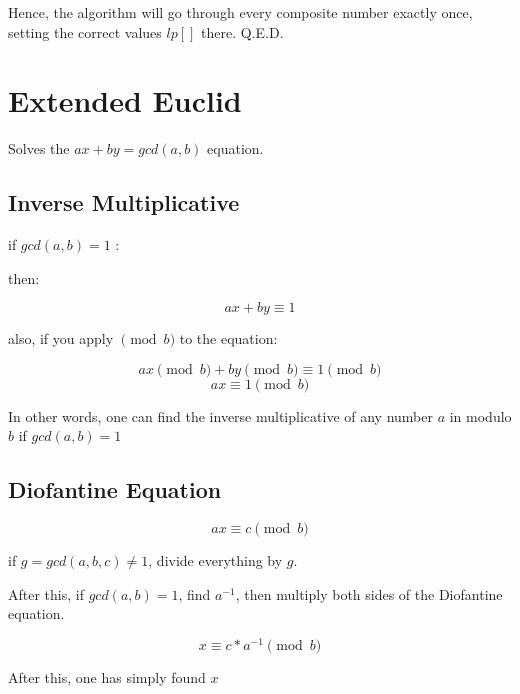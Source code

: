         Hence, the algorithm will go through every composite number exactly once, setting the correct values 
        $lp []$ there. Q.E.D.



\section{Extended Euclid}

    Solves the $ ax + by = gcd(a, b)$ equation.

    \subsection{Inverse Multiplicative}

    if \textbf{ $gcd(a, b) = 1$ }:

    then:

    $$ax + by \equiv 1$$

    also, if you apply $\pmod{b}$ to the equation:

    $$ ax \pmod{b} + by \pmod{b} \equiv 1 \pmod{b} $$
    $$ ax \equiv 1 \pmod{b} $$

    In other words, one can find the inverse multiplicative of any number $a$ in modulo $b$ if $gcd(a, b) = 1$

    \subsection{Diofantine Equation}

    $$ ax \equiv c \pmod{b} $$

    if $g = gcd({a, b, c}) \neq 1$, divide everything by $g$.

    After this, if $gcd(a, b) = 1$, find $a^{-1}$, then multiply both sides of the Diofantine equation.

    $$ x \equiv c * a^{-1} \pmod{b} $$

    After this, one has simply found $x$

